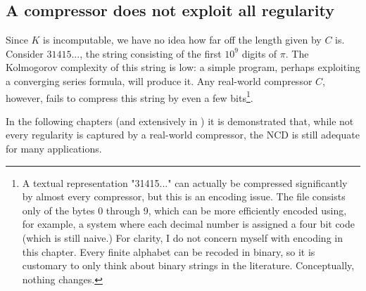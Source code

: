 \subsection{A compressor does not exploit all regularity}
Since $K$ is incomputable, we have no idea how far off the length given by $C$ is. Consider $31415...$, the string consisting of the first $10^{9}$ digits of $\pi$. The Kolmogorov complexity of this string is low: a simple program, perhaps exploiting a converging series formula, will produce it. Any real-world compressor $C$, however, fails to compress this string by even a few bits\footnote{A textual representation "31415..." can actually be compressed significantly by almost every compressor, but this is an encoding issue. The file consists only of the bytes 0 through 9, which can be more efficiently encoded using, for example, a system where each decimal number is assigned a four bit code (which is still naive.) For clarity, I do not concern myself with encoding in this chapter. Every finite alphabet can be recoded in binary, so it is customary to only think about binary strings in the literature. Conceptually, nothing changes. }.

In the following chapters (and extensively in \cite{Cilibrasi2005}) it is demonstrated that, while not every regularity is captured by a real-world compressor, the $\text{NCD}$ is still adequate for many applications.
